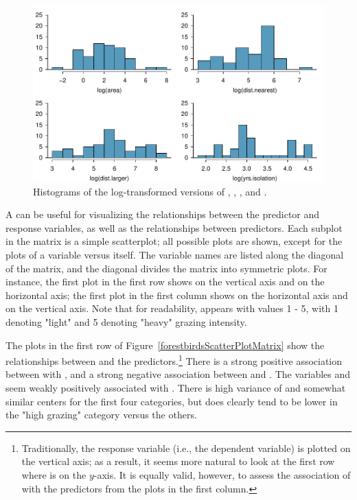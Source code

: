 \begin{figure}[h!]
	\centering
	\includegraphics[width=\textwidth]
	{ch_multiple_linear_regression_oi_biostat/figures/forestbirdsLogPredictorDist/forestbirdsLogPredictorDist.pdf}
    \caption{Histograms of the log-transformed versions of , , , and .}
   	\label{forestbirdsLogPredictorDist}
\end{figure}

\textD{\newpage}

A  can be useful for visualizing the relationships between the predictor and response variables, as well as the relationships between predictors. Each subplot in the matrix is a simple scatterplot; all possible plots are shown, except for the plots of a variable versus itself. The variable names are listed along the diagonal of the matrix, and the diagonal divides the matrix into symmetric plots. For instance, the first plot in the first row shows  on the vertical axis and  on the horizontal axis; the first plot in the first column shows  on the horizontal axis and  on the vertical axis. Note that for readability,  appears with values 1 - 5, with 1 denoting "light" and 5 denoting "heavy" grazing intensity.

The plots in the first row of Figure~\ref{forestbirdsScatterPlotMatrix} show the relationships between  and the predictors.\footnote{Traditionally, the response variable (i.e., the dependent variable) is plotted on the vertical axis; as a result, it seems more natural to look at the first row where  is on the $y$-axis. It is equally valid, however, to assess the association of  with the predictors from the plots in the first column.} There is a strong positive association between  with , and a strong negative association between  and . The variables  and  seem weakly positively associated with . There is high variance of  and somewhat similar centers for the first four categories, but  does clearly tend to be lower in the "high grazing" category versus the others.

